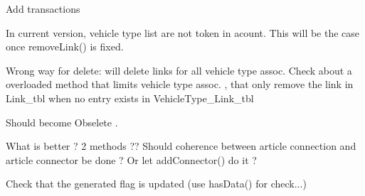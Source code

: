 \begin{DoxyRefList}
\item[\label{todo__todo000051}%
\hypertarget{todo__todo000051}{}%
Member \hyperlink{classmdt_cl_direct_link_aa7a155c3bf99b91e2d9cff85e93f332b}{mdt\-Cl\-Direct\-Link\-:\-:add\-Links\-By\-Unit\-Connector} (const Q\-Variant unit\-Connector\-Id\-S, const Q\-Variant unit\-Connector\-Id\-E, \hyperlink{classmdt_cl_path_graph}{mdt\-Cl\-Path\-Graph} $\ast$graph)]Add transactions  
\item[\label{todo__todo000053}%
\hypertarget{todo__todo000053}{}%
Member \hyperlink{classmdt_cl_link_ac32bfef9f23b431ea4d3d546e6c21361}{mdt\-Cl\-Link\-:\-:disconnect\-Connectors} (const Q\-Variant \&start\-Unit\-Connector\-Id, const Q\-Variant \&end\-Unit\-Connector\-Id, const Q\-List$<$ Q\-Variant $>$ \&start\-Vehicle\-Type\-Id\-List, const Q\-List$<$ Q\-Variant $>$ \&end\-Vehicle\-Type\-Id\-List)]In current version, vehicle type list are not token in acount. This will be the case once remove\-Link() is fixed.  
\item[\label{todo__todo000052}%
\hypertarget{todo__todo000052}{}%
Member \hyperlink{classmdt_cl_link_a865c0cee1fab1c9209d139dcd70f9fbd}{mdt\-Cl\-Link\-:\-:remove\-Link} (const Q\-Variant \&unit\-Connection\-Start\-Id, const Q\-Variant \&unit\-Connection\-End\-Id, bool handle\-Transaction=true)]Wrong way for delete\-: will delete links for all vehicle type assoc. Check about a overloaded method that limits vehicle type assoc. , that only remove the link in Link\-\_\-tbl when no entry exists in Vehicle\-Type\-\_\-\-Link\-\_\-tbl  
\item[\label{todo__todo000054}%
\hypertarget{todo__todo000054}{}%
Member \hyperlink{classmdt_cl_path_graph_a63ddfb9e8d64041ad17c992eac172a8a}{mdt\-Cl\-Path\-Graph\-:\-:last\-Error\-Message} () const ]Should become Obselete .  
\item[\label{todo__todo000055}%
\hypertarget{todo__todo000055}{}%
Member \hyperlink{classmdt_cl_unit_a9aa3d52f4e6d79fa003d96e04be8223e}{mdt\-Cl\-Unit\-:\-:add\-Connection\-Data\-List\-From\-Article\-Connection\-Id\-List} (\hyperlink{classmdt_cl_unit_connector_data}{mdt\-Cl\-Unit\-Connector\-Data} \&data, const Q\-List$<$ Q\-Variant $>$ \&article\-Connection\-Id\-List, bool copy\-Contact\-Name)]What is better ? 2 methods ?? Should coherence between article connection and article connector be done ? Or let add\-Connector() do it ? 
\item[\label{todo__todo000056}%
\hypertarget{todo__todo000056}{}%
Member \hyperlink{classmdt_cl_unit_connection_data_a6922e05be582dd95de82bfe4dd8434f9}{mdt\-Cl\-Unit\-Connection\-Data\-:\-:mdt\-Cl\-Unit\-Connection\-Data} (const Q\-Sql\-Record \&record)]Check that the generated flag is updated (use has\-Data() for check...)  

\end{DoxyRefList}
